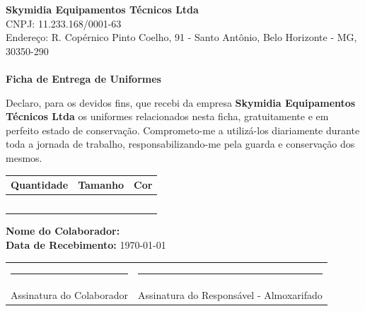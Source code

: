 \documentclass[12pt,a4paper]{article}
\begin{document}
\begin{center}
    {\Large \textbf{Skymidia Equipamentos Técnicos Ltda}} \\[0.2cm]
    CNPJ: 11.233.168/0001-63 \\[0.2cm]
    Endereço: R. Copérnico Pinto Coelho, 91 - Santo Antônio, Belo Horizonte - MG, 30350-290 \\[0.5cm]
    \hrulefill \\[0.5cm]
    {\large \textbf{Ficha de Entrega de Uniformes}} \\[1cm]
\end{center}

\vspace{1cm}

\noindent Declaro, para os devidos fins, que recebi da empresa \textbf{Skymidia Equipamentos Técnicos Ltda} os uniformes relacionados nesta ficha, gratuitamente e em perfeito estado de conservação. Comprometo-me a utilizá-los diariamente durante toda a jornada de trabalho, responsabilizando-me pela guarda e conservação dos mesmos.

\vspace{1cm}

\renewcommand{\arraystretch}{1.3}
\begin{longtable}{|>{\centering\arraybackslash}m{4cm}|>{\centering\arraybackslash}m{4cm}|>{\centering\arraybackslash}m{4cm}|}
\hline
\textbf{Quantidade} & \textbf{Tamanho} & \textbf{Cor} \\ \hline
 & & \\ \hline
 & & \\ \hline
 & & \\ \hline
 & & \\ \hline
 & & \\ \hline
\end{longtable}

\vspace{1cm}

\noindent \textbf{Nome do Colaborador:} \hrulefill \\[1cm]
\noindent \textbf{Data de Recebimento:} \today \\[1cm]

\vspace{1cm}

\begin{tabular}{p{7cm} p{7cm}}
    \rule{7cm}{0.4pt} & \rule{7cm}{0.4pt} \\[-0.2cm]
    \centering Assinatura do Colaborador & \centering Assinatura do Responsável - Almoxarifado
\end{tabular}
\end{document}
